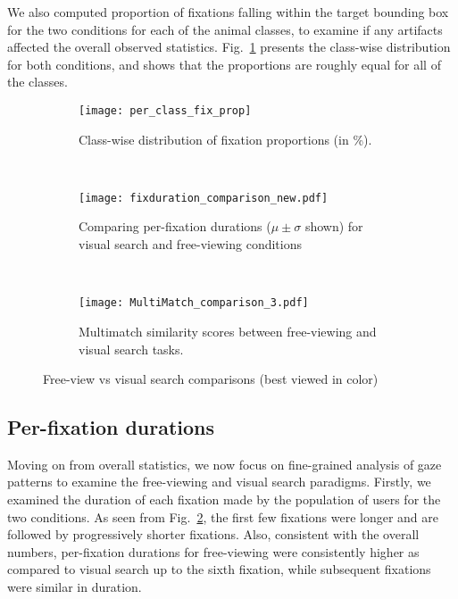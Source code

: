 \documentclass{article}
\begin{document}
We also computed proportion of fixations falling within the target bounding box for the two conditions for each of the animal classes, to examine if any artifacts affected the overall observed statistics. Fig.~\ref{cwfp} presents the class-wise distribution for both conditions, and shows that the proportions are roughly equal for all of the classes.   




\begin{figure*}[!ht]
    \centering
    \begin{subfigure}[t]{0.22\textwidth}
        \centering
        \texttt{[image: per\_class\_fix\_prop]}
        \caption{Class-wise distribution of fixation proportions (in \%).}\label{cwfp}
    \end{subfigure}~
    \begin{subfigure}[t]{0.37\textwidth}
        \centering
        \texttt{[image: fixduration\_comparison\_new.pdf]}
        \caption{Comparing per-fixation durations ($\mu \pm \sigma$ shown) for visual search and free-viewing conditions}\label{pfdc}
    \end{subfigure}
~
    \begin{subfigure}[t]{0.37\textwidth}
        \centering
        \texttt{[image: MultiMatch\_comparison\_3.pdf]}
        \caption{Multimatch similarity scores between free-viewing and visual search tasks.}\label{Mmatch}
    \end{subfigure}
		\caption{Free-view vs visual search comparisons (best viewed in color)}
  \end{figure*}

\subsection{Per-fixation durations}
Moving on from overall statistics, we now focus on fine-grained analysis of gaze patterns to examine the free-viewing and visual search paradigms. Firstly, we examined the duration of each fixation made by the population of users for the two conditions. As seen from Fig.~\ref{pfdc}, the first few fixations were longer and are followed by progressively shorter fixations. Also, consistent with the overall numbers, per-fixation durations for free-viewing were consistently higher as compared to visual search up to the sixth fixation, while subsequent fixations were similar in duration.
\end{document}
